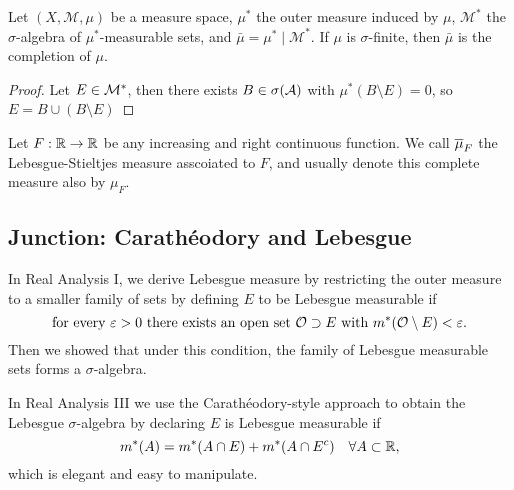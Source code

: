 \begin{exercise}
    Let $(X, \mathcal{M}, \mu)$ be a measure space, $\mu^*$ the outer measure induced by $\mu$, $\mathcal{M}^*$ the $\sigma$-algebra of $\mu^*$-measurable sets, and $\bar{\mu}=\mu^* \mid \mathcal{M}^*$.
    If $\mu$ is $\sigma$-finite, then $\bar{\mu}$ is the completion of $\mu$.
\end{exercise}
\begin{proof}
    Let $E \in \mathcal{M}^*$, then there exists $B \in \sigma(\mathcal{A})$ with $\mu^*(B \setminus E) = 0$, so $E = B \cup (B \setminus E)$
\end{proof}

\begin{definition}
    Let $F: \mathbb{R} \to \mathbb{R}$ be any increasing and right continuous function. We call $\overline{\mu}_F$ the Lebesgue-Stieltjes measure asscoiated to $F$, and usually denote this complete measure also by $\mu_F$. 
\end{definition}


\subsection{Junction: Carath\'eodory and Lebesgue}
In Real Analysis I, we derive Lebesgue measure by restricting the outer measure to a smaller family of sets by defining $E$ to be Lebesgue measurable if 
$$\text{for every }\varepsilon>0 \text{ there exists an open set }\mathcal{O} \supset E \text{ with }m^*(\mathcal{O} \setminus E) < \varepsilon.$$
Then we showed that under this condition, the family of Lebesgue measurable sets forms a $\sigma$-algebra. 

In Real Analysis III we use the Carath\'eodory-style approach to obtain the Lebesgue $\sigma$-algebra by declaring $E$ is Lebesgue measurable if 
$$m^*(A) = m^*(A \cap E) + m^*(A \cap E^c) \quad \forall A \subset \mathbb{R}, $$
which is elegant and easy to manipulate. 

